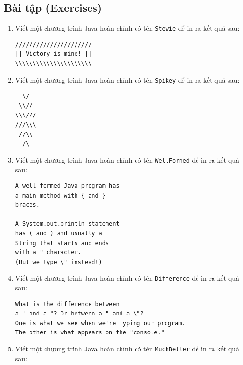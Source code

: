 \subsection{Bài tập (Exercises)}\label{buxe0i-tux1eadp-exercises}

\begin{enumerate}
\def\labelenumi{\arabic{enumi}.}
\item
  Viết một chương trình Java hoàn chỉnh có tên \texttt{Stewie} để in ra
  kết quả sau:

\begin{verbatim}
//////////////////////
|| Victory is mine! ||
\\\\\\\\\\\\\\\\\\\\\\
\end{verbatim}
\item
  Viết một chương trình Java hoàn chỉnh có tên \texttt{Spikey} để in ra
  kết quả sau:

\begin{verbatim}
  \/
 \\//
\\\///
///\\\
 //\\
  /\
\end{verbatim}
\item
  Viết một chương trình Java hoàn chỉnh có tên \texttt{WellFormed} để in
  ra kết quả sau:

\begin{verbatim}
A well–formed Java program has
a main method with { and }
braces.

A System.out.println statement
has ( and ) and usually a
String that starts and ends
with a " character.
(But we type \" instead!)
\end{verbatim}
\item
  Viết một chương trình Java hoàn chỉnh có tên \texttt{Difference} để in
  ra kết quả sau:

\begin{verbatim}
What is the difference between
a ' and a "? Or between a " and a \"?
One is what we see when we're typing our program.
The other is what appears on the "console."
\end{verbatim}
\item
  Viết một chương trình Java hoàn chỉnh có tên \texttt{MuchBetter} để in
  ra kết quả sau:


\end{enumerate}
